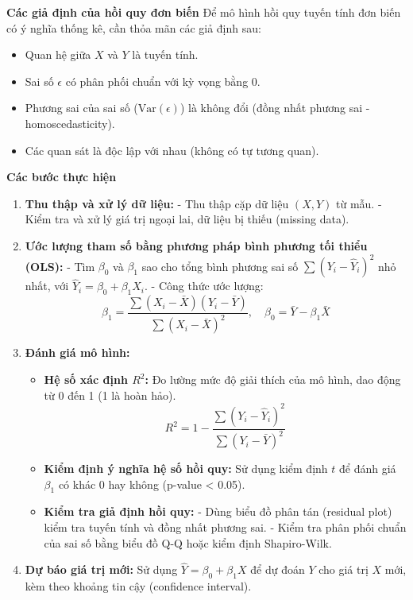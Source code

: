 \documentclass[a4paper,12pt]{article}
\begin{document}
\textbf{Các giả định của hồi quy đơn biến}  
Để mô hình hồi quy tuyến tính đơn biến có ý nghĩa thống kê, cần thỏa mãn các giả định sau:  
\begin{itemize}
    \item Quan hệ giữa \(X\) và \(Y\) là tuyến tính.  
    \item Sai số \(\epsilon\) có phân phối chuẩn với kỳ vọng bằng 0.  
    \item Phương sai của sai số (\(\text{Var}(\epsilon)\)) là không đổi (đồng nhất phương sai - homoscedasticity).  
    \item Các quan sát là độc lập với nhau (không có tự tương quan).  
\end{itemize}

\textbf{Các bước thực hiện}  
\begin{enumerate}
    \item \textbf{Thu thập và xử lý dữ liệu:}  
    - Thu thập cặp dữ liệu \((X, Y)\) từ mẫu.  
    - Kiểm tra và xử lý giá trị ngoại lai, dữ liệu bị thiếu (missing data).  
    \item \textbf{Ước lượng tham số bằng phương pháp bình phương tối thiểu (OLS):}  
    - Tìm \(\beta_0\) và \(\beta_1\) sao cho tổng bình phương sai số \(\sum (Y_i - \hat{Y}_i)^2\) nhỏ nhất, với \(\hat{Y}_i = \beta_0 + \beta_1 X_i\).  
    - Công thức ước lượng:  
    \[
    \beta_1 = \frac{\sum (X_i - \bar{X})(Y_i - \bar{Y})}{\sum (X_i - \bar{X})^2}, \quad \beta_0 = \bar{Y} - \beta_1 \bar{X}
    \]  
    \item \textbf{Đánh giá mô hình:}  
    \begin{itemize}
        \item \textbf{Hệ số xác định \(R^2\):} Đo lường mức độ giải thích của mô hình, dao động từ 0 đến 1 (1 là hoàn hảo).  
        \[
        R^2 = 1 - \frac{\sum (Y_i - \hat{Y}_i)^2}{\sum (Y_i - \bar{Y})^2}
        \]
        \item \textbf{Kiểm định ý nghĩa hệ số hồi quy:} Sử dụng kiểm định \(t\) để đánh giá \(\beta_1\) có khác 0 hay không (p-value < 0.05).  
        \item \textbf{Kiểm tra giả định hồi quy:}  
        - Dùng biểu đồ phân tán (residual plot) kiểm tra tuyến tính và đồng nhất phương sai.  
        - Kiểm tra phân phối chuẩn của sai số bằng biểu đồ Q-Q hoặc kiểm định Shapiro-Wilk.  
    \end{itemize}
    \item \textbf{Dự báo giá trị mới:} Sử dụng \(\hat{Y} = \beta_0 + \beta_1 X\) để dự đoán \(Y\) cho giá trị \(X\) mới, kèm theo khoảng tin cậy (confidence interval).  
\end{enumerate}
\end{document}
